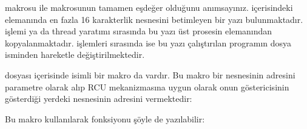 \documentclass[a4paper,10pt,turkish]{sphinxmanual}
\begin{document}
\sphinxAtStartPar
{} makrosu ile  makrosunun tamamen eşdeğer olduğunu anımsayınız.
 içerisindeki  elemanında en fazla 16 karakterlik  nesnesini
betimleyen bir yazı bulunmaktadır.  işlemi ya da thread yaratımı sırasında bu yazı üst prosesin
 elemanından kopyalanmaktadır.  işlemleri sırasında ise bu yazı çalıştırılan programın
dosya isminden hareketle değiştirilmektedir.

\sphinxAtStartPar
{} dosyası içerisinde  isimli bir makro da vardır. Bu makro bir
 nesnesinin adresini parametre olarak alıp RCU mekanizmasına uygun olarak onun
 göstericisinin gösterdiği yerdeki  nesnesinin adresini vermektedir:

\begin{sphinxVerbatim}[commandchars=\\\{\}]

\end{sphinxVerbatim}

\sphinxAtStartPar
Bu makro kullanılarak  fonksiyonu şöyle de yazılabilir:
\end{document}
